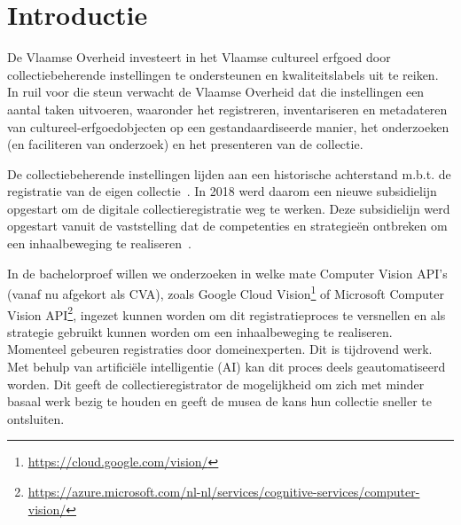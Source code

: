 
\section{Introductie} %
\label{sec:introductie}

De Vlaamse Overheid investeert in het Vlaamse cultureel erfgoed door collectiebeherende instellingen te ondersteunen en kwaliteitslabels uit te reiken. In ruil voor die steun verwacht de Vlaamse Overheid dat die instellingen een aantal taken uitvoeren, waaronder het registreren, inventariseren en metadateren van cultureel-erfgoedobjecten op een gestandaardiseerde manier, het onderzoeken (en faciliteren van onderzoek) en het presenteren van de collectie.~\autocites{AKE2014}{Gatz2016}

De collectiebeherende instellingen lijden aan een historische achterstand m.b.t. de registratie van de eigen collectie~\autocite{Gatz2016}. In 2018 werd daarom een nieuwe subsidielijn opgestart om de digitale collectieregistratie weg te werken. Deze subsidielijn werd opgestart vanuit de vaststelling dat de competenties en strategie{\"e}n ontbreken om een inhaalbeweging te realiseren~\autocite{JeugdMediaC2018a}.

In de bachelorproef willen we onderzoeken in welke mate Computer Vision API's (vanaf nu afgekort als CVA), zoals Google Cloud Vision\footnote{\url{https://cloud.google.com/vision/}} of Microsoft Computer Vision API\footnote{\url{https://azure.microsoft.com/nl-nl/services/cognitive-services/computer-vision/}}, ingezet kunnen worden om dit registratieproces te versnellen en als strategie gebruikt kunnen worden om een inhaalbeweging te realiseren. Momenteel gebeuren registraties door domeinexperten. Dit is tijdrovend werk. Met behulp van artifici{\"e}le intelligentie (AI) kan dit proces deels geautomatiseerd worden. Dit geeft de collectieregistrator de mogelijkheid om zich met minder basaal werk bezig te houden en geeft de musea de kans hun collectie sneller te ontsluiten.

